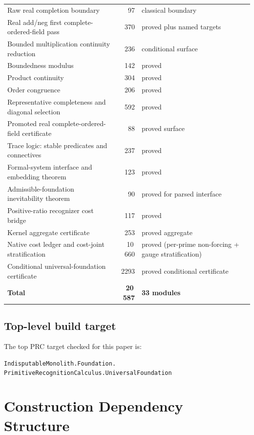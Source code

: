 \documentclass[11pt,a4paper]{article}
\theoremstyle{definition}
\theoremstyle{remark}
\begin{document}
\begin{longtable}{p{7.0cm}rp{4.4cm}}
Raw real completion boundary & 97 & classical boundary \\
Real add/neg first complete-ordered-field pass & 370 & proved plus named targets \\
Bounded multiplication continuity reduction & 236 & conditional surface \\
Boundedness modulus & 142 & proved \\
Product continuity & 304 & proved \\
Order congruence & 206 & proved \\
Representative completeness and diagonal selection & 592 & proved \\
Promoted real complete-ordered-field certificate & 88 & proved surface \\
Trace logic: stable predicates and connectives & 237 & proved \\
Formal-system interface and embedding theorem & 123 & proved \\
Admissible-foundation inevitability theorem & 90 & proved for parsed interface \\
Positive-ratio recognizer cost bridge & 117 & proved \\
Kernel aggregate certificate & 253 & proved aggregate \\
Native cost ledger and cost-joint stratification & 10\,660 & proved (per-prime non-forcing + gauge stratification) \\
Conditional universal-foundation certificate & 2293 & proved conditional certificate \\
\midrule
\textbf{Total} & \textbf{20\,587} & \textbf{33 modules} \\
\bottomrule
\end{longtable}
\normalsize

\subsection{Top-level build target}

The top PRC target checked for this paper is:
\begin{center}
\small\texttt{IndisputableMonolith.Foundation.}\\
\texttt{PrimitiveRecognitionCalculus.UniversalFoundation}
\end{center}

\section{Construction Dependency Structure}\label{app:deps}
\end{document}
